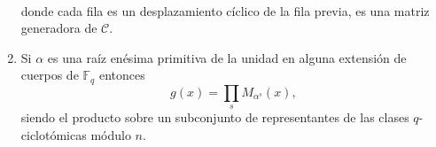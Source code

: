 \begin{theorem}
\begin{enumerate}[resume]
\begin{align*}
    \end{align*}
    donde cada fila es un desplazamiento cíclico de la fila previa, es una matriz generadora de \(\mathcal C\).
    \item Si \(\alpha\) es una raíz enésima primitiva de la unidad en alguna extensión de cuerpos de \(\mathbb F_q\) entonces \[
      g(x) = \prod_s M_{\alpha^s}(x),
    \] siendo el producto sobre un subconjunto de representantes de las clases \(q\)-ciclotómicas módulo \(n\).
  \end{enumerate}
\end{theorem}

